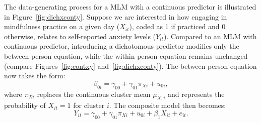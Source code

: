 \documentclass[stu]{apa7}
\begin{document}
The data-generating process for a MLM with a continuous predictor is illustrated in Figure~\ref{fig:dichxconty}. Suppose we are interested in how engaging in mindfulness practice on a given day (\(X_{it}\)), coded as 1 if practiced and 0 otherwise, relates to self-reported anxiety levels (\(Y_{it}\)). Compared to an MLM with continuous predictor, introducing a dichotomous predictor modifies only the between-person equation, while the within-person equation remains unchanged (compare Figures~\ref{fig:contxy} and~\ref{fig:dichxconty}). The between-person equation now takes the form:  
\begin{equation}
    \label{eqn:beta0-generationdichxconty}
\beta_{0i} = \gamma_{00} + \gamma_{01} \pi_{Xi} + u_{0i},
\end{equation}
where \( \pi_{Xi} \) replaces the continuous cluster mean \( \mu_{X,i} \) and represents the probability of \( X_{it} = 1 \) for cluster \( i \). The composite model then becomes:
\begin{equation}
Y_{it} = \gamma_{00} + \gamma_{01} \pi_{Xi} + u_{0i} + \beta_1 X_{it} + e_{it}.
\end{equation}

\end{document}
